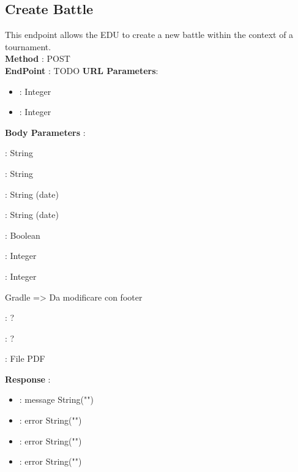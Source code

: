 \subsection*{Create Battle}
This endpoint allows the EDU to create a new battle within the context of a tournament.\\
\textbf{Method} : POST \\
\textbf{EndPoint} : {\color{blue} TODO}
\textbf{URL Parameters}:
\begin{itemize}
    \item {} : Integer
    \item {} : Integer
\end{itemize}
\textbf{Body Parameters} :
\begin{itemize}
    \item {} : String
    \item {} : String
    \item {} : String (date)
    \item {} : String (date)
    \item {} : Boolean
    \item {} : Integer
    \item {} : Integer
    
    {\color{red}
    Gradle => Da modificare con footer
    \item {} : ?
    \item {} : ?
    \item {} : File PDF
    }
    
\end{itemize}
\textbf{Response} :
\begin{itemize}
    \item {} : message String("")
    \item {} : error String("")
    \item {} : error String("")
    \item {} : error String("")
\end{itemize}

